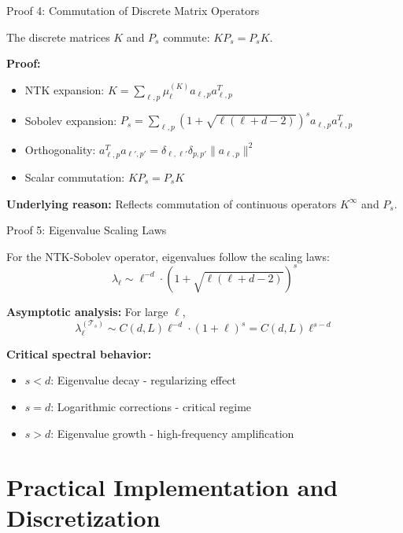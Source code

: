 \documentclass{beamer}
\begin{document}
\begin{frame}{Proof 4: Commutation of Discrete Matrix Operators}
\begin{theorem}
The discrete matrices $K$ and $P_s$ commute: $KP_s = P_sK$.
\end{theorem}

\textbf{Proof:}
\begin{itemize}
\item NTK expansion: $K = \sum_{\ell,p} \mu_\ell^{(K)} a_{\ell,p} a_{\ell,p}^T$
\item Sobolev expansion: $P_s = \sum_{\ell,p} (1 + \sqrt{\ell(\ell + d - 2)})^s a_{\ell,p} a_{\ell,p}^T$
\item Orthogonality: $a_{\ell,p}^T a_{\ell',p'} = \delta_{\ell,\ell'} \delta_{p,p'} \|a_{\ell,p}\|^2$
\item Scalar commutation: $KP_s = P_sK$
\end{itemize}

\textbf{Underlying reason:} Reflects commutation of continuous operators $K^{\infty}$ and $P_s$.
\end{frame}

\begin{frame}{Proof 5: Eigenvalue Scaling Laws}
\begin{theorem}
For the NTK-Sobolev operator, eigenvalues follow the scaling laws:
\[ \lambda_\ell \sim \ell^{-d} \cdot (1 + \sqrt{\ell(\ell + d - 2)})^s \]
\end{theorem}

\textbf{Asymptotic analysis:} For large $\ell$,
\[ \lambda_\ell^{(\mathcal{T}_s)} \sim C(d, L) \ell^{-d} \cdot (1 + \ell)^s = C(d, L) \ell^{s-d} \]

\textbf{Critical spectral behavior:}
\begin{itemize}
\item $s < d$: Eigenvalue decay - regularizing effect
\item $s = d$: Logarithmic corrections - critical regime
\item $s > d$: Eigenvalue growth - high-frequency amplification
\end{itemize}
\end{frame}

\section{Practical Implementation and Discretization}
\end{document}
